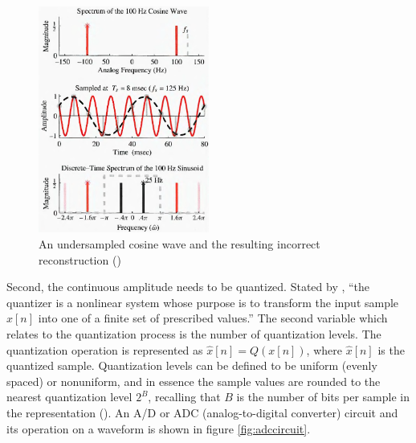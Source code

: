 \documentclass[report.tex]{subfiles}
\begin{document}
\begin{figure}[ht]
	\centering
	\includegraphics[width=0.5\textwidth]{./images-tftheory/aliasing_undersampling.png}
	\caption{An undersampled cosine wave and the resulting incorrect reconstruction (\cite{dspfirst})}
	\label{fig:aliasing}
\end{figure}

Second, the continuous amplitude needs to be quantized. Stated by \textcite[Chapter~4]{discretebook}, ``the quantizer is a nonlinear system whose purpose is to transform the input sample $x[n]$ into one of a finite set of prescribed values.'' The second variable which relates to the quantization process is the number of quantization levels. The quantization operation is represented as $ \hat{x}[n] = Q(x[n])$, where $\hat{x}[n]$ is the quantized sample. Quantization levels can be defined to be uniform (evenly spaced) or nonuniform, and in essence the sample values are rounded to the nearest quantization level $2^{B}$, recalling that $B$ is the number of bits per sample in the representation (\cite{discretebook}). An A/D or ADC (analog-to-digital converter) circuit and its operation on a waveform is shown in figure \ref{fig:adccircuit}.
\end{document}
